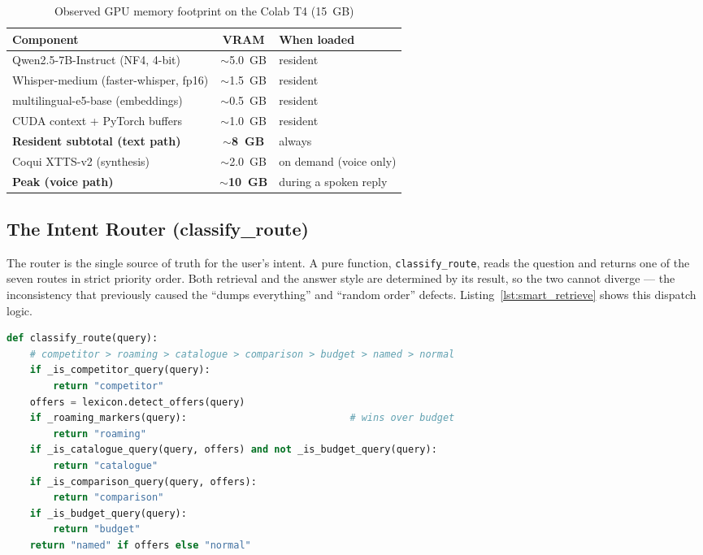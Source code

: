 \documentclass[12pt, a4paper]{report}
\newcommand{\humantext}[1]{#1}      %
\newcommand{\vramResident}{8}\newcommand{\vramPeak}{10}
\begin{document}
\begin{table}[H]
\centering
\caption{Observed GPU memory footprint on the Colab T4 (15~GB)}
\label{tab:vram}
\begin{tabularx}{\textwidth}{X c l}
\toprule
\textbf{Component} & \textbf{VRAM} & \textbf{When loaded} \\
\midrule
Qwen2.5-7B-Instruct (NF4, 4-bit)      & $\sim$5.0~GB & resident \\
Whisper-medium (faster-whisper, fp16) & $\sim$1.5~GB & resident \\
multilingual-e5-base (embeddings)     & $\sim$0.5~GB & resident \\
CUDA context + PyTorch buffers        & $\sim$1.0~GB & resident \\
\midrule
\textbf{Resident subtotal (text path)} & \textbf{$\sim$\vramResident~GB} & always \\
\midrule
Coqui XTTS-v2 (synthesis)             & $\sim$2.0~GB & on demand (voice only) \\
\midrule
\textbf{Peak (voice path)}            & \textbf{$\sim$\vramPeak~GB} & during a spoken reply \\
\bottomrule
\end{tabularx}
\end{table}

\subsection{The Intent Router (classify\_route)}
\humantext{The router is the single source of truth for the user's intent. A pure function, \texttt{classify\_route}, reads the question and returns one of the seven routes in strict priority order. Both retrieval and the answer style are determined by its result, so the two cannot diverge --- the inconsistency that previously caused the ``dumps everything'' and ``random order'' defects. Listing~\ref{lst:smart_retrieve} shows this dispatch logic.}

\begin{lstlisting}[language=Python, caption={Priority-ordered intent classification (first match wins)}, label={lst:smart_retrieve}]
def classify_route(query):
    # competitor > roaming > catalogue > comparison > budget > named > normal
    if _is_competitor_query(query):
        return "competitor"
    offers = lexicon.detect_offers(query)
    if _roaming_markers(query):                            # wins over budget
        return "roaming"
    if _is_catalogue_query(query, offers) and not _is_budget_query(query):
        return "catalogue"
    if _is_comparison_query(query, offers):
        return "comparison"
    if _is_budget_query(query):
        return "budget"
    return "named" if offers else "normal"
\end{lstlisting}
\end{document}
